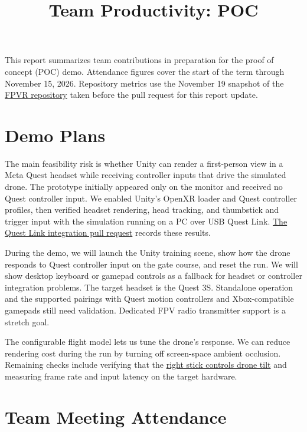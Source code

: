 \documentclass{article}
\title{Team Productivity: POC\\\progname}
\author{\authname}
\date{}
\begin{document}
\maketitle

This report summarizes team contributions in preparation for the proof of
concept (POC) demo. Attendance figures cover the start of the term through
November 15, 2026. Repository metrics use the November 19 snapshot of the
\href{https://github.com/SoftwareMandems/FPVR}{FPVR repository} taken before
the pull request for this report update.

\section{Demo Plans}

The main feasibility risk is whether Unity can render a first-person view in
a Meta Quest headset while receiving controller inputs that drive the simulated
drone. The prototype initially appeared only on the monitor and received no
Quest controller input. We enabled Unity's OpenXR loader and Quest controller
profiles, then verified headset rendering, head tracking, and thumbstick and
trigger input with the simulation running on a PC over USB Quest Link.
\href{https://github.com/SoftwareMandems/FPVR-Game/pull/12}{The Quest Link
integration pull request} records these results.

During the demo, we will launch the Unity training scene, show how the drone
responds to Quest controller input on the gate course, and reset the run.
We will show desktop keyboard or gamepad controls as a fallback for headset or
controller integration problems. The target headset is the Quest 3S. Standalone
operation and the supported pairings with Quest motion controllers and
Xbox-compatible gamepads still need validation. Dedicated FPV radio transmitter
support is a stretch goal.

The configurable flight model lets us tune the drone's response. We can reduce
rendering cost during the run by turning off screen-space ambient occlusion.
Remaining checks include verifying that the
\href{https://github.com/SoftwareMandems/FPVR-Game/issues/13}{right stick
controls drone tilt} and measuring frame rate and input latency on the target
hardware.

\section{Team Meeting Attendance}
\end{document}
